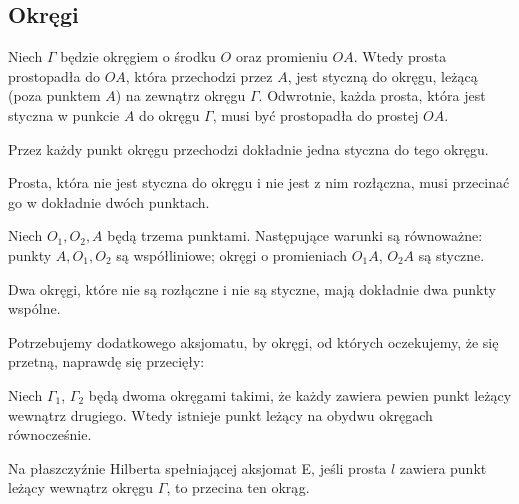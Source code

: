 \subsection{Okręgi}

\begin{proposition}
    Niech $\Gamma$ będzie okręgiem o środku $O$ oraz promieniu $OA$.
    Wtedy prosta prostopadła do $OA$, która przechodzi przez $A$, jest styczną do okręgu, leżącą (poza punktem $A$) na zewnątrz okręgu $\Gamma$.
    Odwrotnie, każda prosta, która jest styczna w punkcie $A$ do okręgu $\Gamma$, musi być prostopadła do prostej $OA$.
\end{proposition} %

\begin{corollary}
    Przez każdy punkt okręgu przechodzi dokładnie jedna styczna do tego okręgu.
\end{corollary} %

\begin{corollary}
    Prosta, która nie jest styczna do okręgu i nie jest z nim rozłączna, musi przecinać go w dokładnie dwóch punktach.
\end{corollary} %

\begin{proposition}
    Niech $O_1, O_2, A$ będą trzema punktami.
    Następujące warunki są równoważne: punkty $A, O_1, O_2$ są współliniowe; okręgi o promieniach $O_1A$, $O_2A$ są styczne.
\end{proposition} %

\begin{corollary}
    Dwa okręgi, które nie są rozłączne i nie są styczne, mają dokładnie dwa punkty wspólne.
\end{corollary} %

Potrzebujemy dodatkowego aksjomatu, by okręgi, od których oczekujemy, że się przetną, naprawdę się przecięły:

\begin{axiom}
    \label{axiom_e}
    Niech $\Gamma_1$, $\Gamma_2$ będą dwoma okręgami takimi, że każdy zawiera pewien punkt leżący wewnątrz drugiego.
    Wtedy istnieje punkt leżący na obydwu okręgach równocześnie.
\end{axiom}

\begin{proposition}
    Na płaszczyźnie Hilberta spełniającej aksjomat E, jeśli prosta $l$ zawiera punkt leżący wewnątrz okręgu $\Gamma$, to przecina ten okrąg.
\end{proposition}

